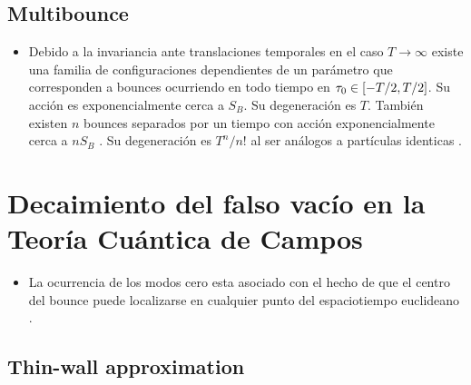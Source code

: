 \documentclass[11pt, a4paper]{article}
\numberwithin{equation}{section}
\theoremstyle{definition}
\begin{document}
\begin{itemize}
%
%
%
%

\end{itemize}

\subsection{Multibounce}

\begin{itemize}
	
	\item Debido a la invariancia ante translaciones temporales en el caso $T \rightarrow \infty$ existe una familia de configuraciones dependientes de un parámetro que corresponden a bounces ocurriendo en todo tiempo en $\tau_0 \in \qty[-T/2, T/2]$. Su acción es exponencialmente cerca a $S_B$. Su degeneración es $T$. También existen $n$ bounces separados por un tiempo con acción  exponencialmente cerca a $nS_B$ . Su degeneración es $T^n/n!$ al ser análogos a partículas identicas \cite{paranjape2017theory}.
	
\end{itemize}

\section{Decaimiento del falso vacío en la Teoría Cuántica de Campos}

\begin{itemize}
\item La ocurrencia de los modos cero esta asociado con el hecho de que el centro del bounce puede localizarse en cualquier punto del espaciotiempo euclideano \cite{rubakov2009classical}. 
\end{itemize}

\subsection{Thin-wall approximation}
 
\end{document}
